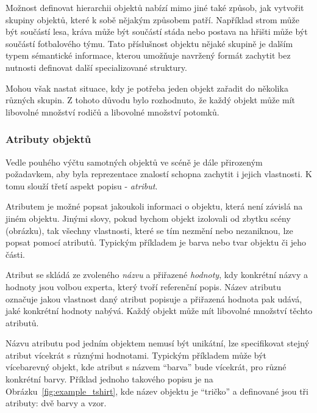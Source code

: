 Možnost definovat hierarchii objektů nabízí mimo jiné také způsob, jak vytvořit skupiny objektů, které k sobě nějakým způsobem patří.
Například strom může být součástí lesa, kráva může být součástí stáda nebo postava na hřišti může být součástí fotbalového týmu.
Tato příslušnost objektu nějaké skupině je dalším typem sémantické informace, kterou umožňuje navržený formát zachytit bez nutnosti definovat další specializované struktury.

Mohou však nastat situace, kdy je potřeba jeden objekt zařadit do několika různých skupin.
Z tohoto důvodu bylo rozhodnuto, že každý objekt může mít libovolné množství rodičů a libovolné množství potomků.

\subsubsection{Atributy objektů}
Vedle pouhého výčtu samotných objektů ve scéně je dále přirozeným požadavkem, aby byla reprezentace znalostí schopna zachytit i jejich vlastnosti.
K tomu slouží třetí aspekt popisu - \emph{atribut}.

Atributem je možné popsat jakoukoli informaci o objektu, která není závislá na jiném objektu.
Jinými slovy, pokud bychom objekt izolovali od zbytku scény (obrázku), tak všechny vlastnosti, které se tím nezmění nebo nezaniknou, lze popsat pomocí atributů.
Typickým příkladem je barva nebo tvar objektu či jeho části.

Atribut se skládá ze zvoleného \emph{názvu} a přiřazené \emph{hodnoty}, kdy konkrétní názvy a hodnoty jsou volbou experta, který tvoří referenční popis.
Název atributu označuje jakou vlastnost daný atribut popisuje a přiřazená hodnota pak udává, jaké konkrétní hodnoty nabývá.
Každý objekt může mít libovolné množství těchto atributů.

Názvu atributu pod jedním objektem nemusí být unikátní, lze specifikovat stejný atribut vícekrát s různými hodnotami.
Typickým příkladem může být vícebarevný objekt, kde atribut s názvem \enquote{barva} bude vícekrát, pro různé konkrétní barvy.
Příklad jednoho takového popisu je na Obrázku~\ref{fig:example_tshirt}, kde název objektu je \enquote{tričko}
a definované jsou tři atributy: dvě barvy a vzor.

